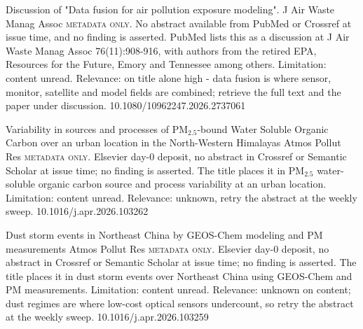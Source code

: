 \documentclass[10pt]{article}
\begin{document}
{Discussion of "Data fusion for air pollution exposure modeling".}
{J Air Waste Manag Assoc}
{\textsc{metadata only.} No abstract available from PubMed or Crossref at issue time, and no finding is asserted. PubMed lists this as a discussion at J Air Waste Manag Assoc 76(11):908-916, with authors from the retired EPA, Resources for the Future, Emory and Tennessee among others. Limitation: content unread. Relevance: on title alone high - data fusion is where sensor, monitor, satellite and model fields are combined; retrieve the full text and the paper under discussion.}
{10.1080/10962247.2026.2737061}

{Variability in sources and processes of PM$_{2.5}$-bound Water Soluble Organic Carbon over an urban location in the North-Western Himalayas}
{Atmos Pollut Res}
{\textsc{metadata only.} Elsevier day-0 deposit, no abstract in Crossref or Semantic Scholar at issue time; no finding is asserted. The title places it in PM$_{2.5}$ water-soluble organic carbon source and process variability at an urban location. Limitation: content unread. Relevance: unknown, retry the abstract at the weekly sweep.}
{10.1016/j.apr.2026.103262}

{Dust storm events in Northeast China by GEOS-Chem modeling and PM measurements}
{Atmos Pollut Res}
{\textsc{metadata only.} Elsevier day-0 deposit, no abstract in Crossref or Semantic Scholar at issue time; no finding is asserted. The title places it in dust storm events over Northeast China using GEOS-Chem and PM measurements. Limitation: content unread. Relevance: unknown on content; dust regimes are where low-cost optical sensors undercount, so retry the abstract at the weekly sweep.}
{10.1016/j.apr.2026.103259}

\par{}\baselineskip{}\baselineskip
{}
\end{document}
